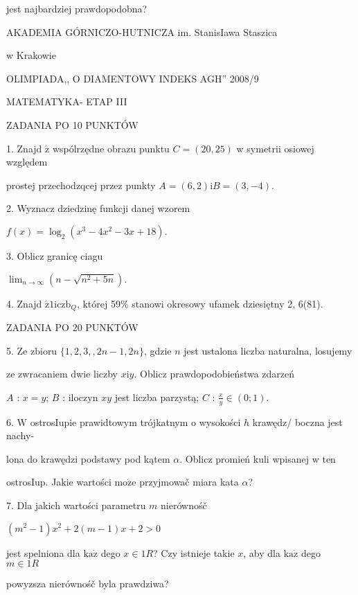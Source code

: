 \documentclass[a4paper,12pt]{article}
\begin{document}
jest najbardziej prawdopodobna?






AKADEMIA GÓRNICZO-HUTNICZA im. StanisIawa Staszica

w Krakowie

OLIMPIADA,, O DIAMENTOWY INDEKS AGH'' 2008/9

MATEMATYKA- ETAP III

ZADANIA PO 10 PUNKTÓW

1. Znajd $\acute{\mathrm{z}}$ wspólrzędne obrazu punktu $C = (20,25)$ w symetrii osiowej względem

prostej przechodzqcej przez punkty $A=(6,2)\mathrm{i}B=(3,-4).$

2. Wyznacz dziedzinę funkcji danej wzorem

$f(x)=\log_{2}(x^{3}-4x^{2}-3x+18).$

3. Oblicz granicę ciagu

$\displaystyle \lim_{n\rightarrow\infty}(n-\sqrt{n^{2}+5n}).$

4. Znajd $\acute{\mathrm{z}}1\mathrm{i}\mathrm{c}\mathrm{z}\mathrm{b}_{Q}$, której 59\% stanowi okresowy ufamek dziesiętny 2, 6(81).

ZADANIA PO 20 PUNKTÓW

5. Ze zbioru $\{1,2,3, ,2n-1,2n\}$, gdzie $n$ jest ustalona liczba naturalna, losujemy

ze zwracaniem dwie liczby $x\mathrm{i}y$. Oblicz prawdopodobieństwa zdarzeń

$A$ : $x=y$; $B$ : iloczyn $xy$ jest liczba parzystą; $C$ : $\displaystyle \frac{x}{y}\in(0;1).$

6. $\mathrm{W}$ ostrosIupie prawidtowym trójkatnym o wysokości $h$ krawędz/ boczna jest nachy-

lona do krawędzi podstawy pod kątem $\alpha$. Oblicz promień kuli wpisanej w ten

ostrosIup. Jakie wartości $\mathrm{m}\mathrm{o}\dot{\mathrm{z}}\mathrm{e}$ przyjmowač miara kata $\alpha$?

7. Dla jakich wartości parametru $m$ nierównośč

$(m^{2}-1)x^{2}+2(m-1)x+2>0$

jest spelniona dla $\mathrm{k}\mathrm{a}\dot{\mathrm{z}}$ dego $x \in 1R$? Czy istnieje takie $x$, aby dla $\mathrm{k}\mathrm{a}\dot{\mathrm{z}}$ dego $m \in 1R$

powyzsza nierównośč byla prawdziwa?
\end{document}

